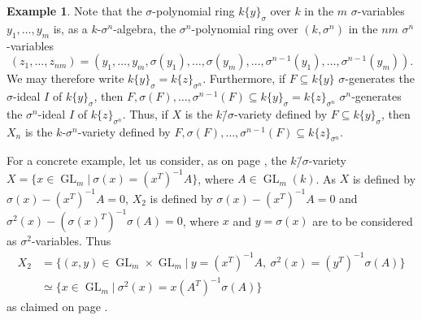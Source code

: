 \documentclass[oneside,reqno]{amsart}
\theoremstyle{definition}
\newtheorem{ex}[theo]{Example}
\newcommand{\Gl}{\operatorname{GL}}
\newcommand{\s}{\sigma}
\newcommand{\ks}{$k$\=/$\s$}
\begin{document}
\begin{ex} \label{ex: Xn}
	Note that the $\s$-polynomial ring $k\{y\}_\s$ over $k$ in the $m$ $\s$-variables $y_1,\ldots,y_m$ is, as a $k$-$\s^n$-algebra, the $\s^n$-polynomial ring over $(k,\s^n)$ in the $nm$ $\s^n$-variables $$(z_1,\ldots,z_{nm})=(y_1,\ldots,y_m,\s(y_1),\ldots,\s(y_m),\ldots,\s^{n-1}(y_1),\ldots,\s^{n-1}(y_m)).$$ 
	We may therefore write $k\{y\}_\s=k\{z\}_{\s^n}$.	
	Furthermore, if $F\subseteq k\{y\}$ $\s$-generates the $\s$-ideal $I$ of $k\{y\}_\s$, then $F,\s(F),\ldots,\s^{n-1}(F)\subseteq k\{y\}_\s=k\{z\}_{\s^n}$ $\s^n$-generates the $\s^n$-ideal $I$ of $k\{z\}_{\s^n}$. Thus, if $X$ is the \ks-variety defined by $F\subseteq k\{y\}_\s$, then $X_n$ is the $k$-$\s^n$-variety defined by $F,\s(F),\ldots,\s^{n-1}(F)\subseteq k\{z\}_{\s^n}$.
	
	For a concrete example, let us consider, as on page \pageref{page: X}, the \ks-variety $X=\{x\in\Gl_m|\ \s(x)=(x^T)^{-1}A\}$, where $A\in\Gl_m(k)$. As $X$ is defined by $\s(x)-(x^T)^{-1}A=0$, $X_2$ is defined by $\s(x)-(x^T)^{-1}A=0$ and $\s^2(x)-(\s(x)^T)^{-1}\s(A)=0$, where $x$ and $y=\s(x)$ are to be considered as $\s^2$-variables.
	Thus	
	\begin{align*}
	X_2&=\{(x,y)\in\Gl_m\times\Gl_m|\ y=(x^T)^{-1}A,\ \s^2(x)=(y^T)^{-1}\s(A) \} \\
	&\simeq\{x\in\Gl_m|\ \s^2(x)=x(A^T)^{-1}\s(A)\}
	\end{align*}
	as claimed on page \pageref{page: X}.	
%	
%	
%	
%
%
\end{ex}
\end{document}
